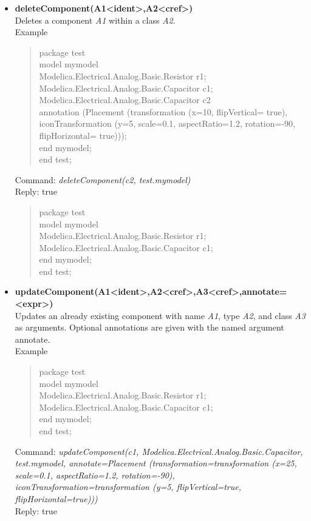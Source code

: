 \documentclass[11pt,a4paper,oneside,english]{book}
\newenvironment{modelicaExamples}{\begin{itemize}}{\end{itemize}}
\newcommand{\api}[2]{\item \textbf{#1} \\ #2}
\newcommand{\tab}{\hspace{2em}}
\newcommand{\command}[1]{Command: \textit{#1}\\}
\newcommand{\reply}[1]{Reply: #1}
\newcommand{\functionex}[2]{\begin{singlespace} \command{#1} \reply{#2} \end{singlespace}}
\newcommand{\examples}{Example}
\newenvironment{mocode}{\begin{verse}\begin{singlespace}\begin{scriptsize}\ttfamily}{\end{scriptsize}\end{singlespace}\end{verse}}
\begin{document}
\begin{modelicaExamples}
		\api{deleteComponent(A1<ident>,A2<cref>)}{Deletes a component \textit{A1} within a class \textit{A2}.\\
		\examples
		\begin{mocode}
		package test\\
		\tab model mymodel\\
		\tab\tab Modelica.Electrical.Analog.Basic.Resistor r1;\\
		\tab\tab Modelica.Electrical.Analog.Basic.Capacitor c1;\\
		\tab\tab Modelica.Electrical.Analog.Basic.Capacitor c2\\
annotation (Placement (trans\-for\-ma\-tion (x=10, flip\-Ver\-ti\-cal= true), i\-con\-Trans\-for\-ma\-tion (y=5, sca\-le=0.1, a\-spect\-Ra\-tio=1.2, ro\-ta\-ti\-on=-90, flip\-Ho\-ri\-zon\-tal= true)));\\
		\tab end mymodel;\\
		end test;
		\end{mocode}
		\functionex{deleteComponent(c2, test.mymodel)}
		{true}

		\begin{mocode}
		package test\\
		\tab model mymodel\\
		\tab\tab Modelica.Electrical.Analog.Basic.Resistor r1;\\
		\tab\tab Modelica.Electrical.Analog.Basic.Capacitor c1;\\
		\tab end mymodel;\\
		end test;\\
		\end{mocode}
		}

		\api{updateComponent(A1<ident>,A2<cref>,A3<cref>,annotate=<expr>)}{Updates an already existing component with name \textit{A1}, type \textit{A2}, and class \textit{A3} as arguments. Optional annotations are given with the named argument annotate.\\
		\examples
		\begin{mocode}
		package test\\
		\tab model mymodel\\
		\tab\tab Modelica.Electrical.Analog.Basic.Resistor r1;\\
		\tab\tab Modelica.Electrical.Analog.Basic.Capacitor c1;\\
		\tab end mymodel;\\
		end test;\\
		\end{mocode}
		\functionex{updateComponent(c1, Modelica.Electrical.Analog.Basic.Capacitor, test.mymodel, annotate=Placement (transformation=transformation (x=25, scale=0.1, aspectRatio=1.2, rotation=-90),  iconTransformation=transformation (y=5, flipVertical=true, flipHorizontal=true)))}
		{true}

}
\end{modelicaExamples}
\end{document}
